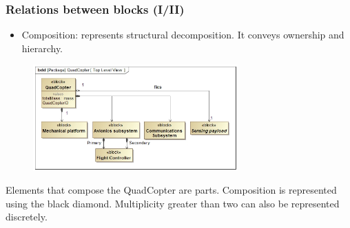 \documentclass[xcolor=dvipsnames,t]{beamer}
\newcommand\fixmegood[1]{\textcolor{red}{#1}}
\begin{document}
\begin{frame}
\begin{columns}


\end{columns}

\end{frame}

\begin{frame}
\frametitle{Relations between blocks (I/II)}
\begin{itemize}
\item Composition: represents structural decomposition. It conveys ownership and hierarchy.%
\end{itemize}
\begin{figure}
 	\includegraphics[width=0.7\textwidth]{QuadTopLevelView.jpg}
\end{figure}


Elements that compose the QuadCopter are parts.\newline
Composition is represented using the black diamond.\newline
Multiplicity greater than two can also be represented discretely.


\end{frame}
\end{document}
